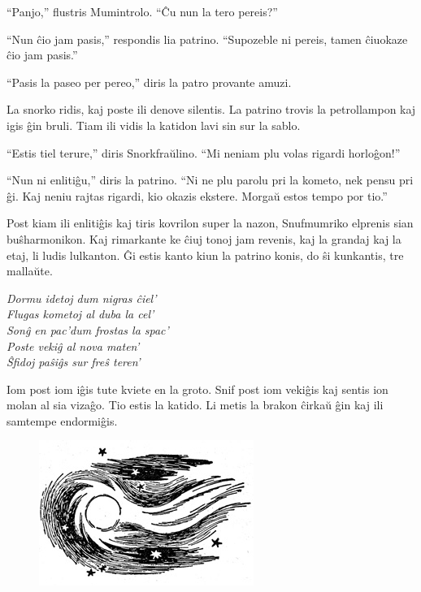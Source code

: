 ``Panjo,'' flustris Mumintrolo. ``Ĉu nun la tero pereis?''

``Nun ĉio jam pasis,'' respondis lia patrino. ``Supozeble ni pereis, tamen ĉiuokaze ĉio jam pasis.''

``Pasis la paseo per pereo,'' diris la patro provante amuzi.

La snorko ridis, kaj poste ili denove silentis. La patrino trovis la petrollampon kaj igis ĝin bruli. Tiam ili vidis la katidon lavi sin sur la sablo.

``Estis tiel terure,'' diris Snorkfraŭlino. ``Mi neniam plu volas rigardi horloĝon!''

``Nun ni enlitiĝu,'' diris la patrino. ``Ni ne plu parolu pri la kometo, nek pensu pri ĝi. Kaj neniu rajtas rigardi, kio okazis ekstere. Morgaŭ estos tempo por tio.''

Post kiam ili enlitiĝis kaj tiris kovrilon super la nazon, Snufmumriko elprenis sian buŝharmonikon. Kaj rimarkante ke ĉiuj tonoj jam revenis, kaj la grandaj kaj la etaj, li ludis lulkanton. Ĝi estis kanto kiun la patrino konis, do ŝi kunkantis, tre mallaŭte.

\begin{center}\itshape Dormu idetoj dum nigras ĉiel'\\
Flugas kometoj al duba la cel'\\
Sonĝ en pac'dum frostas la spac'\\
Poste vekiĝ al nova maten'\\
Ŝfidoj paŝiĝs sur freŝ teren'\\\end{center}

Iom post iom iĝis tute kviete en la groto. Snif post iom vekiĝis kaj sentis ion molan al sia vizaĝo. Tio estis la katido. Li metis la brakon ĉirkaŭ ĝin kaj ili samtempe endormiĝis.

\begin{figure}[htbp]
\centering
\includegraphics[width=198pt,height=134pt]{9-13.png}
\caption{}
\label{9-13}
\end{figure}

